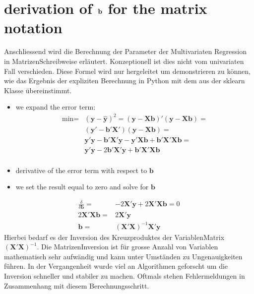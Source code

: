 \documentclass[letterpaper,10pt,english]{jupyterBook}
\begin{document}
\chapter{derivation of \protect\(\mathbf{b}\protect\) for the matrix notation}
\label{\detokenize{Regression_Techniques:derivation-of-mathbf-b-for-the-matrix-notation}}
\sphinxAtStartPar
Anschliessend wird die Berechnung der Parameter der Multivariaten Regression in Matrizen\sphinxhyphen{}Schreibweise erläutert.  Konzeptionell ist dies nicht vom univariaten Fall verschieden. Diese Formel wird nur hergeleitet um demonstrieren zu können, wie das Ergebnis der expliziten Berechnung in Python mit dem aus der sklearn Klasse  übereinstimmt.
\begin{itemize}
\item {} 
\sphinxAtStartPar
we expand the error term:
\begin{align*}
    \text{min}=&(\mathbf{y}-\hat{\mathbf{y}})^2=(\mathbf{y}-\mathbf{X}\mathbf{b})'(\mathbf{y}-\mathbf{X}\mathbf{b})=\\
    &(\mathbf{y}'-\mathbf{b}'\mathbf{X}')(\mathbf{y}-\mathbf{X}\mathbf{b})=\\
    &\mathbf{y}'\mathbf{y}-\mathbf{b}'\mathbf{X}'\mathbf{y}-\mathbf{y}'
    \mathbf{X}\mathbf{b}+\mathbf{b}'\mathbf{X}'\mathbf{X}\mathbf{b}=\\
    &\mathbf{y}'\mathbf{y}-2\mathbf{b}'\mathbf{X}'\mathbf{y}+\mathbf{b}'\mathbf{X}'
    \mathbf{X}\mathbf{b}\\
  \end{align*}
\item {} 
\sphinxAtStartPar
derivative of the error term with respect to \(\mathbf{b}\)

\item {} 
\sphinxAtStartPar
we set the result equal to zero and solve for \(\mathbf{b}\)

\end{itemize}
\begin{align*}
    \frac{\delta}{\delta
      \mathbf{b}}=&-2\mathbf{X}'\mathbf{y}+2\mathbf{X}'\mathbf{X}\mathbf{b}=0\\
    2\mathbf{X}'\mathbf{X}\mathbf{b}=&2\mathbf{X}'\mathbf{y}\\
    \mathbf{b}=&(\mathbf{X}'\mathbf{X})^{-1}\mathbf{X}'\mathbf{y}\quad
  \end{align*}
\sphinxAtStartPar
Hierbei bedarf es der Inversion des Kreuzproduktes der Variablen\sphinxhyphen{}Matrix \((\mathbf{X}'\mathbf{X})^{-1}\). Die Matrizen\sphinxhyphen{}Inversion ist für grosse Anzahl von Variablen mathematisch sehr aufwändig und kann unter Umständen zu Ungenauigkeiten führen. In der Vergangenheit wurde viel an Algorithmen geforscht um die Inversion schneller und stabiler zu machen. Oftmals stehen Fehlermeldungen in Zusammenhang mit diesem Berechnungsschritt.
\end{document}
